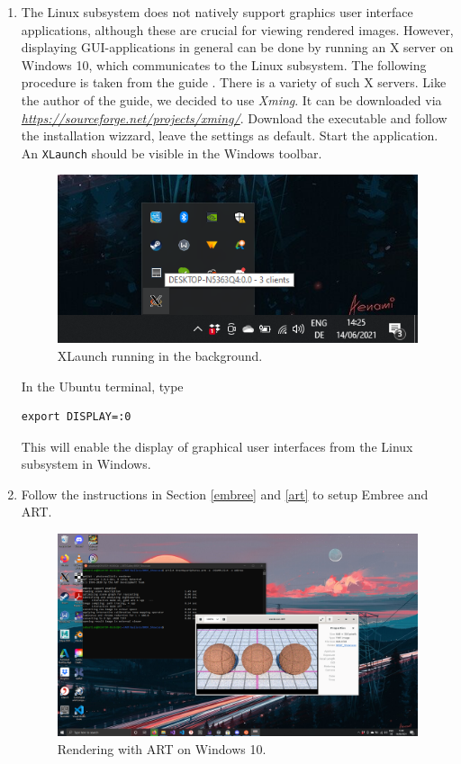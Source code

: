 \begin{enumerate}
	\item The Linux subsystem does not natively support graphics user interface applications, although these are crucial for viewing rendered images. However, displaying GUI-applications in general can be done by running an X server on Windows 10, which communicates to the Linux subsystem. The following procedure is taken from the guide  \cite{windowsSubsystem}. There is a variety of such X servers. Like the author of the guide, we decided to use \emph{Xming}. It can be downloaded via
	\emph{\href{https://sourceforge.net/projects/xming/}{https://sourceforge.net/projects/xming/}}.
	Download the executable and follow the installation wizzard, leave the settings as default. Start the application. An \texttt{XLaunch} should be visible in the Windows toolbar.
	\begin{figure}[h]
		\centering
		\includegraphics[width=.5\linewidth]{img/appendix/xlaunch.png}
		\caption{XLaunch running in the background.}
		\label{fig:xlaunch}
	\end{figure}  
	
	In the Ubuntu terminal, type
	\begin{Verbatim}
export DISPLAY=:0
	\end{Verbatim}
	This will enable the display of graphical user interfaces from the Linux subsystem in Windows.
	
	
	\item Follow the instructions in Section \ref{embree} and \ref{art} to setup Embree and ART.
	
\begin{figure}[h]
	\centering
	\includegraphics[width=1\linewidth]{img/appendix/final.png}
	\caption{Rendering with ART on Windows 10.}
	\label{fig:final}
\end{figure}
	
	
\end{enumerate}
